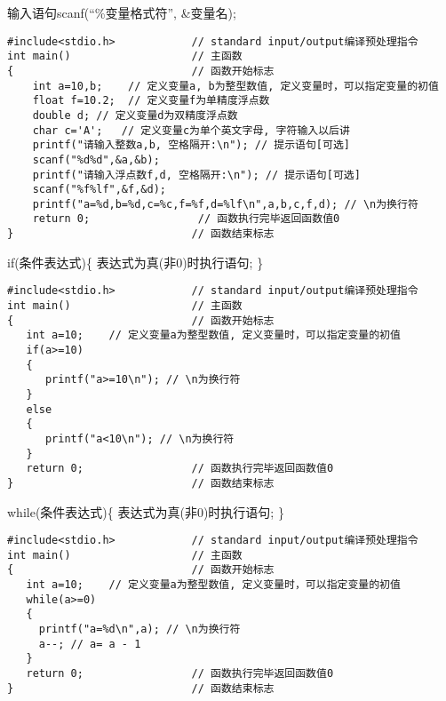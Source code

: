 \begin{frame}[fragile]{输入语句scanf(``\%变量格式符'', \&变量名);}
\begin{lstlisting}
#include<stdio.h>            // standard input/output编译预处理指令
int main()                   // 主函数
{                            // 函数开始标志
    int a=10,b;    // 定义变量a, b为整型数值, 定义变量时，可以指定变量的初值
    float f=10.2;  // 定义变量f为单精度浮点数
    double d; // 定义变量d为双精度浮点数
    char c='A';   // 定义变量c为单个英文字母, 字符输入以后讲
    printf("请输入整数a,b, 空格隔开:\n"); // 提示语句[可选]
    scanf("%d%d",&a,&b);
    printf("请输入浮点数f,d, 空格隔开:\n"); // 提示语句[可选]
    scanf("%f%lf",&f,&d);
    printf("a=%d,b=%d,c=%c,f=%f,d=%lf\n",a,b,c,f,d); // \n为换行符
    return 0;                 // 函数执行完毕返回函数值0
}                            // 函数结束标志
\end{lstlisting}
\end{frame}

\begin{frame}[fragile]{if(条件表达式)\{ 表达式为真(非0)时执行语句; \}}
\begin{lstlisting}
#include<stdio.h>            // standard input/output编译预处理指令
int main()                   // 主函数
{                            // 函数开始标志
   int a=10;    // 定义变量a为整型数值, 定义变量时，可以指定变量的初值
   if(a>=10)
   {
      printf("a>=10\n"); // \n为换行符
   }
   else
   {
      printf("a<10\n"); // \n为换行符
   }
   return 0;                 // 函数执行完毕返回函数值0
}                            // 函数结束标志
\end{lstlisting}
\end{frame}

\begin{frame}[fragile]{while(条件表达式)\{ 表达式为真(非0)时执行语句; \}}
\begin{lstlisting}
#include<stdio.h>            // standard input/output编译预处理指令
int main()                   // 主函数
{                            // 函数开始标志
   int a=10;    // 定义变量a为整型数值, 定义变量时，可以指定变量的初值
   while(a>=0)
   {
     printf("a=%d\n",a); // \n为换行符
     a--; // a= a - 1
   }
   return 0;                 // 函数执行完毕返回函数值0
}                            // 函数结束标志
\end{lstlisting}
\end{frame}



